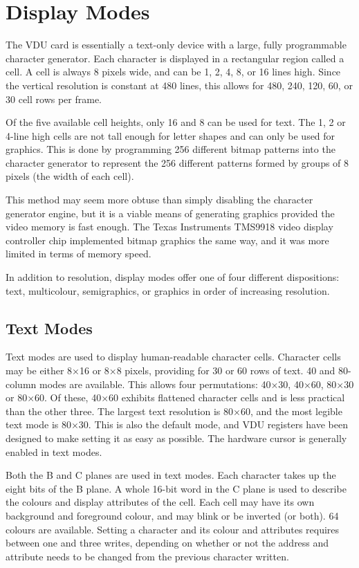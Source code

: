 \section{Display Modes}
\label{sec:vdu:modes}

The VDU card is essentially a text-only device with a large, fully programmable
character generator. Each character is displayed in a rectangular region called
a cell. A cell is always 8 pixels wide, and can be 1, 2, 4, 8, or 16 lines
high. Since the vertical resolution is constant at 480 lines, this allows for
480, 240, 120, 60, or 30 cell rows per frame.

Of the five available cell heights, only 16 and 8 can be used for text. The 1,
2 or 4-line high cells are not tall enough for letter shapes and can only be
used for graphics. This is done by programming 256 different bitmap patterns
into the character generator to represent the 256 different patterns formed by
groups of 8 pixels (the width of each cell).

This method may seem more obtuse than simply disabling the character generator
engine, but it is a viable means of generating graphics provided the video
memory is fast enough. The Texas Instruments TMS9918 video display controller
chip implemented bitmap graphics the same way, and it was more limited in terms
of memory speed.

In addition to resolution, display modes offer one of four different
dispositions: text, multicolour, semigraphics, or graphics in order of
increasing resolution.


\subsection{Text Modes}

Text modes are used to display human-readable character cells. Character cells
may be either 8×16 or 8×8 pixels, providing for 30 or 60 rows of text. 40 and
80-column modes are available. This allows four permutations: 40×30, 40×60,
80×30 or 80×60. Of these, 40×60 exhibits flattened character cells and is less
practical than the other three. The largest text resolution is 80×60, and the
most legible text mode is 80×30. This is also the default mode, and VDU
registers have been designed to make setting it as easy as possible. The
hardware cursor is generally enabled in text modes.

Both the B and C planes are used in text modes. Each character takes up the
eight bits of the B plane. A whole 16-bit word in the C plane is used to
describe the colours and display attributes of the cell. Each cell may have its
own background and foreground colour, and may blink or be inverted (or
both). 64 colours are available. Setting a character and its colour and
attributes requires between one and three writes, depending on whether or not
the address and attribute needs to be changed from the previous character
written.

